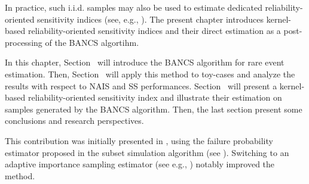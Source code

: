 In practice, such i.i.d. samples may also be used to estimate dedicated reliability-oriented sensitivity indices (see, e.g., \citealp{chabridon2021global,marrel_chabridon_2021}). 
The present chapter introduces kernel-based reliability-oriented sensitivity indices and their direct estimation as a post-processing of the BANCS algortihm. 

In this chapter, Section~ will introduce the BANCS algorithm for rare event estimation. 
Then, Section~ will apply this method to  toy-cases and analyze the results with respect to NAIS and SS performances. 
Section~ will present a kernel-based reliability-oriented sensitivity index and illustrate their estimation on samples generated by the BANCS algorithm. 
Then, the last section present some conclusions and research perspectives.

\begin{remark}
    This contribution was initially presented in \citet{fekhari_ICASP_2023}, using the failure probability estimator proposed in the subset simulation algorithm (see ). 
    Switching to an adaptive importance sampling estimator (see e.g., ) notably improved the method.    
\end{remark}


